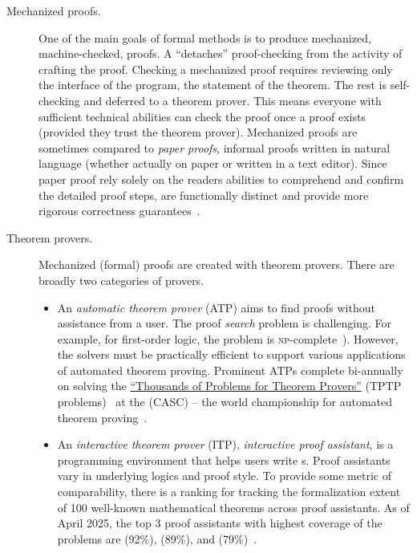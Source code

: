 \begin{description}
\item[Mechanized proofs.]
One of the main goals of formal methods is to produce mechanized, \ie
machine-checked, proofs. A  \enquote{detaches}
proof-checking from the activity of crafting the proof. Checking a mechanized
proof requires reviewing only the interface of the program, \ie the statement of
the theorem. The rest is self-checking and deferred to a theorem prover. This
means everyone with sufficient technical abilities can check the proof once a
proof exists (provided they trust the theorem prover). Mechanized
proofs are sometimes compared to \emph{paper proofs},
\ie informal proofs written in natural language (whether actually on paper or
written in a text editor). Since paper proof rely solely on the readers
abilities to comprehend and confirm the detailed proof steps,  are functionally distinct and provide more rigorous correctness
guarantees~\cite{gonthier2008}.

\item[Theorem provers.]
Mechanized (formal) proofs are created with theorem
provers. There are broadly two categories of provers.

\begin{itemize}
\item An \emph{automatic theorem prover} (ATP)
aims to find proofs without assistance from a user. The proof \emph{search}
problem is challenging. For example, for first-order logic, the problem is
\textsc{np}-complete~\cite{cook1971,
levin1973}). However, the solvers must be
practically efficient to support various applications of automated theorem
proving. Prominent ATPs complete bi-annually on solving the
\href{https://www.tptp.org}{\enquote{Thousands of Problems for Theorem Provers}}
(TPTP problems)~\cite{sutcliffe2024} at the
\href{https://tptp.org/CASC/}{} (CASC) -- the
world championship for automated theorem proving~\cite{casc}.

\item An \emph{interactive theorem prover}
(ITP), \aka \emph{interactive proof assistant}, is a programming environment
that helps users write s. Proof assistants vary in
underlying logics and proof style. To provide some metric of comparability,
there is a ranking for tracking the formalization extent of 100 well-known
mathematical theorems across proof assistants. As of April 2025, the top 3 proof
assistants with highest coverage of the problems are  (92\%),
 (89\%), and  (79\%)~\cite{hundredtheorems}.
\end{itemize}


\end{description}
